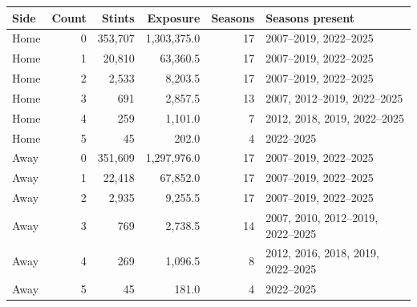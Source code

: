 \begin{tabular}{lrrrrp{5.0cm}}
\toprule
Side & Count & Stints & Exposure & Seasons & Seasons present \\
\midrule
Home & 0 & 353,707 & 1,303,375.0 & 17 & 2007--2019, 2022--2025 \\
Home & 1 & 20,810 & 63,360.5 & 17 & 2007--2019, 2022--2025 \\
Home & 2 & 2,533 & 8,203.5 & 17 & 2007--2019, 2022--2025 \\
Home & 3 & 691 & 2,857.5 & 13 & 2007, 2012--2019, 2022--2025 \\
Home & 4 & 259 & 1,101.0 & 7 & 2012, 2018, 2019, 2022--2025 \\
Home & 5 & 45 & 202.0 & 4 & 2022--2025 \\
Away & 0 & 351,609 & 1,297,976.0 & 17 & 2007--2019, 2022--2025 \\
Away & 1 & 22,418 & 67,852.0 & 17 & 2007--2019, 2022--2025 \\
Away & 2 & 2,935 & 9,255.5 & 17 & 2007--2019, 2022--2025 \\
Away & 3 & 769 & 2,738.5 & 14 & 2007, 2010, 2012--2019, 2022--2025 \\
Away & 4 & 269 & 1,096.5 & 8 & 2012, 2016, 2018, 2019, 2022--2025 \\
Away & 5 & 45 & 181.0 & 4 & 2022--2025 \\
\bottomrule
\end{tabular}
